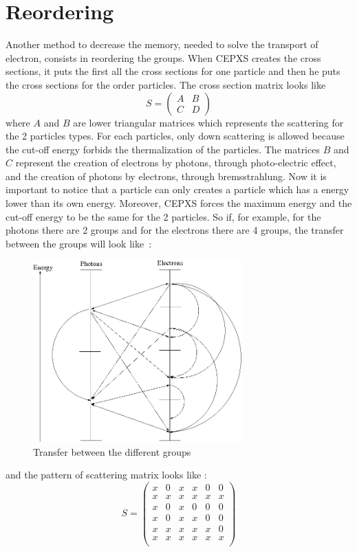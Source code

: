 \section{Reordering}
Another method to decrease the memory, needed to solve the transport of
electron, consists in reordering the groups. When CEPXS creates the cross sections,
it puts the first all the cross sections for one particle and then he puts the
cross sections for the order particles.  The cross section matrix looks like
\begin{equation}
S = 
\begin{pmatrix}
A & B\\
C & D
\end{pmatrix}
\end{equation}
where $A$ and $B$ are lower triangular matrices which represents the
scattering for the 2 particles types. For each particles, only down scattering
is allowed because the cut-off energy forbids the thermalization of the
particles. The matrices $B$ and $C$ represent the creation of electrons by
photons, through photo-electric effect, and the creation of photons by
electrons, through bremsstrahlung. Now it is important to notice that a
particle can only creates a particle which has a energy lower than its own
energy. Moreover, CEPXS forces the maximum energy and the cut-off energy to
be the same for the 2 particles. So if, for example, for the photons
there are 2 groups and for the electrons there are 4 groups, the transfer between
the groups will look \hbox{like :}
\begin{figure}[H]
\begin{center}
\includegraphics[height=7cm]{group.png}
\caption{Transfer between the different groups}
\end{center}
\end{figure}
and the pattern of scattering matrix looks like :
\begin{equation}
S =
\begin{pmatrix}
x & 0 & x & x & 0 & 0\\
x & x & x & x & x & x\\
x & 0 & x & 0 & 0 & 0\\
x & 0 & x & x & 0 & 0\\
x & x & x & x & x & 0\\
x & x & x & x & x & x\\
\end{pmatrix}
\end{equation}

